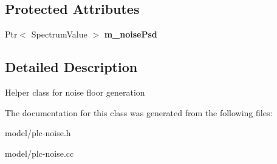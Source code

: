 \subsection*{\-Protected \-Attributes}
\begin{DoxyCompactItemize}
\item 
\hypertarget{classns3_1_1PLC__NoiseFloor_af46ff8903a05607566f42262dfd80d13}{\-Ptr$<$ \-Spectrum\-Value $>$ {\bfseries m\-\_\-noise\-Psd}}\label{classns3_1_1PLC__NoiseFloor_af46ff8903a05607566f42262dfd80d13}

\end{DoxyCompactItemize}


\subsection{\-Detailed \-Description}
\-Helper class for noise floor generation 

\-The documentation for this class was generated from the following files\-:\begin{DoxyCompactItemize}
\item 
model/plc-\/noise.\-h\item 
model/plc-\/noise.\-cc\end{DoxyCompactItemize}
